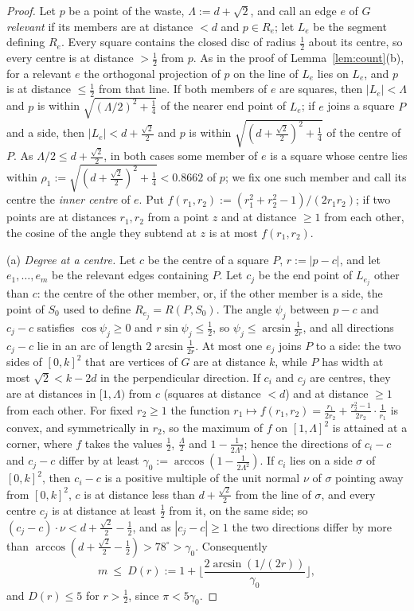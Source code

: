 \documentclass[11pt]{amsart}
\theoremstyle{definition}
\theoremstyle{remark}
\begin{document}
\begin{proof}
Let $p$ be a point of the waste, $\Lambda:=d+\sqrt2$, and call an edge $e$ of $G$ \emph{relevant} if its members are at distance
$<d$ and $p\in R_e$; let $L_e$ be the segment defining $R_e$. Every square contains the closed disc of radius $\frac12$ about its
centre, so every centre is at distance $>\frac12$ from $p$. As in the proof of Lemma~\ref{lem:count}(b), for a relevant $e$ the
orthogonal projection of $p$ on the line of $L_e$ lies on $L_e$, and $p$ is at distance $\le\frac12$ from that line. If both
members of $e$ are squares, then $|L_e|<\Lambda$ and $p$ is within $\sqrt{(\Lambda/2)^2+\frac14}$ of the nearer end point of $L_e$;
if $e$ joins a square $P$ and a side, then $|L_e|<d+\frac{\sqrt2}2$ and $p$ is within $\sqrt{(d+\frac{\sqrt2}2)^2+\frac14}$ of the centre
of $P$. As $\Lambda/2\le d+\frac{\sqrt2}2$, in both cases some member of $e$ is a square whose centre lies within
$\rho_1:=\sqrt{(d+\frac{\sqrt2}2)^2+\frac14}<0.8662$ of $p$; we fix one such member and call its centre the \emph{inner centre}
of $e$. Put $f(r_1,r_2):=(r_1^2+r_2^2-1)/(2r_1r_2)$; if two points are at distances $r_1,r_2$ from a point $z$ and at distance
$\ge1$ from each other, the cosine of the angle they subtend at $z$ is at most $f(r_1,r_2)$.

(a) \emph{Degree at a centre.} Let $c$ be the centre of a square $P$, $r:=|p-c|$, and let $e_1,\dots,e_m$ be the relevant edges
containing $P$. Let $c_j$ be the end point of $L_{e_j}$ other than $c$: the centre of the other member, or, if the other member
is a side, the point of $S_0$ used to define $R_{e_j}=R(P,S_0)$. The angle $\psi_j$ between $p-c$ and $c_j-c$ satisfies
$\cos\psi_j\ge0$ and $r\sin\psi_j\le\frac12$, so $\psi_j\le\arcsin\frac1{2r}$, and all directions $c_j-c$ lie in an arc of length
$2\arcsin\frac1{2r}$. At most one $e_j$ joins $P$ to a side: the two sides of $[0,k]^2$ that are vertices of $G$ are at distance $k$,
while $P$ has width at most $\sqrt2<k-2d$ in the perpendicular direction. If $c_i$ and $c_j$ are centres, they are at distances in
$[1,\Lambda)$ from $c$ (squares at distance $<d$) and at distance $\ge1$ from each other. For fixed $r_2\ge1$ the function
$r_1\mapsto f(r_1,r_2)=\frac{r_1}{2r_2}+\frac{r_2^2-1}{2r_2}\cdot\frac1{r_1}$ is convex, and symmetrically in $r_2$, so the maximum of $f$ on
$[1,\Lambda]^2$ is attained at a corner, where $f$ takes the values $\frac12$, $\frac\Lambda2$ and $1-\frac1{2\Lambda^2}$; hence the directions of
$c_i-c$ and $c_j-c$ differ by at least $\gamma_0:=\arccos(1-\frac1{2\Lambda^2})$. If $c_i$ lies on a side $\sigma$ of $[0,k]^2$, then $c_i-c$ is
a positive multiple of the unit normal $\nu$ of $\sigma$ pointing away from $[0,k]^2$, $c$ is at distance less than $d+\frac{\sqrt2}2$
from the line of $\sigma$, and every centre $c_j$ is at distance at least $\frac12$ from it, on the same side; so
$(c_j-c)\cdot\nu<d+\frac{\sqrt2}2-\frac12$, and as $|c_j-c|\ge1$ the two directions differ by more than
$\arccos(d+\frac{\sqrt2}2-\frac12)>78^\circ>\gamma_0$. Consequently
\[
m\ \le\ D(r):=1+\Big\lfloor\frac{2\arcsin(1/(2r))}{\gamma_0}\Big\rfloor ,
\]
and $D(r)\le5$ for $r>\frac12$, since $\pi<5\gamma_0$.


\end{proof}
\end{document}
